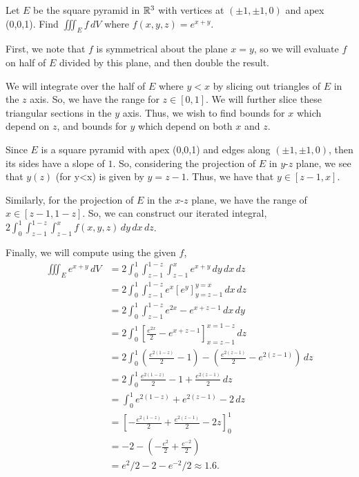 \documentclass[../hw7]{subfiles}
\begin{document}
\begin{problem}[4]
Let $E$ be the square pyramid in $\mathbb{R}^3$ with vertices at $(\pm 1,\pm 1,0)$ and apex (0,0,1). Find $\iiint_E f\,dV$ where $f(x,y,z)=e^{x + y}$.
\end{problem}
First, we note that $f$ is symmetrical about the  plane $x=y$,
so we will evaluate $f$ on half of $E$ divided by this plane,
and then double the result.

We will integrate over the half of $E$ where $y<x$ by slicing out triangles of $E$ in the $z$ axis.
So, we have the range for $z \in [0,1]$.
We will further slice these triangular sections in the $y$ axis.
Thus, we wish to find bounds for $x$ which depend on $z$, and bounds for $y$ which depend on both $x$ and $z$.

Since  $E$ is a square pyramid with apex (0,0,1) and edges along $( \pm 1, \pm 1,0)$, then its sides have a slope of $1$.
So, considering the projection of $E$ in $y$-$z$ plane, we see that $y(z)$ (for y<x) is given by $y=z-1$.
Thus, we have that $y \in [z-1,x]$.

Similarly, for the projection of $E$ in the $x$-$z$ plane, we have the range of $x \in [z-1,1-z]$.
So, we can construct our iterated integral, $2\int_{0}^{1} \int_{z-1}^{1-z} \int_{z-1}^{x}  f(x,y,z) \,dy\,dx\,dz$.

Finally, we will compute using the given $f$,
\begin{align*}
	\iiint_E e^{x+y} \,dV & = 2\int_{0}^{1} \int_{z-1}^{1-z} \int_{z-1}^{x} e^{x+y} \,dy\,dx\,dz                                        \\
	                      & = 2\int_{0}^{1} \int_{z-1}^{1-z} e^x {\left[ e^y \right]}_{y=z-1}^{y=x} \,dx\,dz                            \\
	                      & = 2\int_{0}^{1} \int_{z-1}^{1-z} e^{2x}-e^{x+z-1} \,dx\,dy                                                  \\
	                      & = 2\int_{0}^{1} {\left[ \frac{e^{2x}}{2}-e^{x+z-1} \right]}_{x=z-1}^{x=1-z}\,dz                             \\
	                      & = 2\int_{0}^{1} \left( \frac{e^{2(1-z)}}{2}-1 \right) - \left( \frac{e^{2(z-1)}}{2}-e^{2(z-1)} \right) \,dz \\
	                      & = 2\int_{0}^{1} \frac{e^{2(1-z)}}{2}-1+\frac{e^{2(z-1)}}{2} \,dz                                            \\
	                      & = \int_0^1 e^{2(1-z)}+e^{2(z-1)}-2 \, dz                                                                    \\
	                      & = {\left[ -\frac{e^{2(1-z)}}{2}+\frac{e^{2(z-1)}}{2} -2z\right] }_0^1                                       \\
	                      & = -2 - \left( -\frac{e^2}{2} + \frac{e^{-2}}{2} \right)                                                     \\
	                      & = e^2/2 - 2 - e^{-2}/2 \approx 1.6.
\end{align*}
\end{document}
